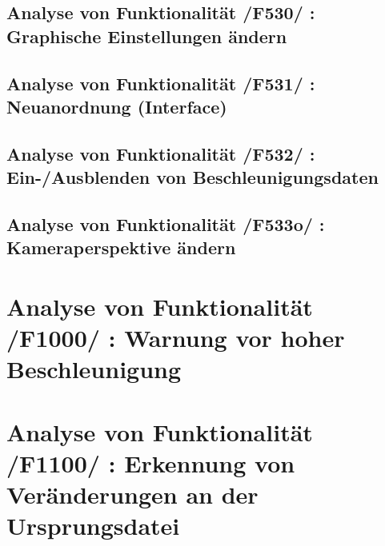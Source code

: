 \subsection{Analyse von Funktionalität /F530/ :  Graphische Einstellungen ändern}
\subsection{Analyse von Funktionalität /F531/ :   Neuanordnung (Interface)}
\subsection{Analyse von Funktionalität /F532/ :  Ein-/Ausblenden von Beschleunigungsdaten}
\subsection{Analyse von Funktionalität /F533o/ :  Kameraperspektive ändern}
\section{Analyse von Funktionalität /F1000/ :  Warnung vor hoher Beschleunigung}
\section{Analyse von Funktionalität /F1100/ :  Erkennung von Veränderungen an der Ursprungsdatei}